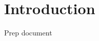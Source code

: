 \documentclass[14pt]{article}
\title{}
\author{}
\begin{document}
\maketitle



\section*{Introduction}
Prep document 
\end{document}
